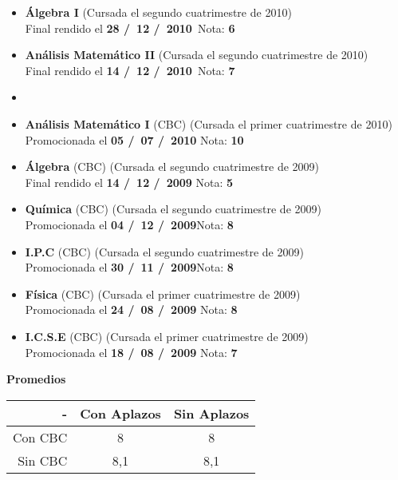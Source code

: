 \begin{itemize}[leftmargin=0.8cm]
\item{\textbf{Álgebra I} (Cursada el segundo cuatrimestre de 2010)\\
Final rendido el \textbf{28 \slash \ 12 \slash \ 2010}\  \hfill Nota: \textbf{6}}
\item{\textbf{Análisis Matemático II} (Cursada el segundo cuatrimestre de 2010)\\
Final rendido el \textbf{14 \slash \ 12 \slash \ 2010}\  \hfill Nota: \textbf{7}}
\item[]
\item{\textbf{Análisis Matemático I} (CBC) (Cursada el primer cuatrimestre de 2010)\\
Promocionada el \textbf{05 \slash \ 07 \slash \ 2010} \hfill Nota: \textbf{10}}
\item{\textbf{Álgebra} (CBC) (Cursada el segundo cuatrimestre de 2009)\\
Final rendido el \textbf{14 \slash \ 12 \slash \ 2009} \hfill Nota: \textbf{5}}
\item{\textbf{Química} (CBC) (Cursada el segundo cuatrimestre de 2009)\\
Promocionada el \textbf{04 \slash \ 12 \slash \ 2009}\hfill Nota: \textbf{8}}
\item{\textbf{I.P.C} (CBC) (Cursada el segundo cuatrimestre de 2009)\\
Promocionada el \textbf{30 \slash \ 11 \slash \ 2009}\hfill Nota: \textbf{8}}
\item{\textbf{Física} (CBC) (Cursada el primer cuatrimestre de 2009)\\
Promocionada el \textbf{24 \slash \ 08 \slash \ 2009} \hfill Nota: \textbf{8}}
\item{\textbf{I.C.S.E} (CBC) (Cursada el primer cuatrimestre de 2009)\\
Promocionada el \textbf{18 \slash \ 08 \slash \ 2009} \hfill Nota: \textbf{7}}
\end{itemize}

\begin{center}
\textbf{Promedios}

  \begin{tabular}{|r|c|c|}
    \hline
    - & Con Aplazos & Sin Aplazos \\
    \hline
    Con CBC & 8 & 8 \\
    \hline
    Sin CBC & 8,1 & 8,1 \\
    \hline
  \end{tabular}

\end{center}
\fi
